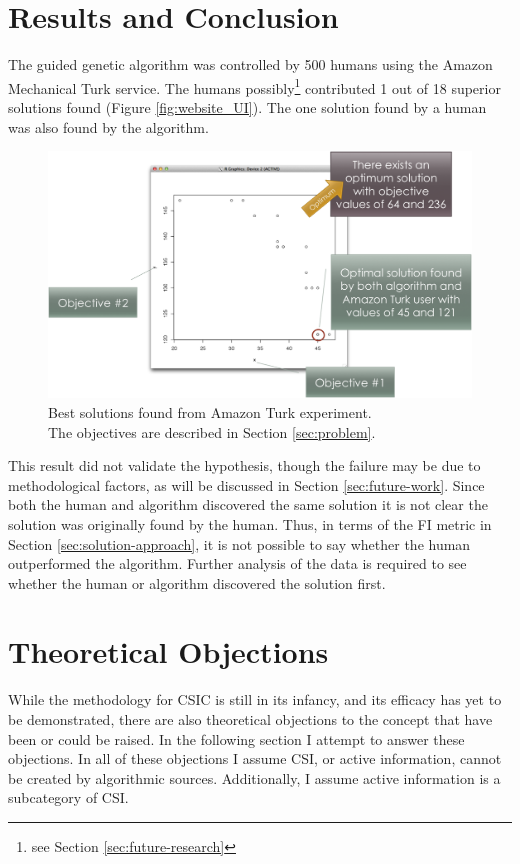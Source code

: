 \section{Results and Conclusion}
The guided genetic algorithm was controlled by 500 humans using the Amazon Mechanical Turk service.  The humans possibly\footnote{see Section \ref{sec:future-research}} contributed 1 out of 18 superior solutions found (Figure \ref{fig:website_UI}).  The one solution found by a human was also found by the algorithm.

\begin{figure}[!t]
  \centering
  \includegraphics[width=4.5in]{HollowayResults}
  \caption{Best solutions found from Amazon Turk experiment.\\The objectives are described in Section \ref{sec:problem}.}
  \label{fig:results}
\end{figure}

This result did not validate the hypothesis, though the failure may be due to methodological factors, as will be discussed in Section \ref{sec:future-work}.  Since both the human and algorithm discovered the same solution it is not clear the solution was originally found by the human.  Thus, in terms of the FI metric in Section \ref{sec:solution-approach}, it is not possible to say whether the human outperformed the algorithm.  Further analysis of the data is required to see whether the human or algorithm discovered the solution first.

\section{Theoretical Objections}\label{sec:objections}

While the methodology for CSIC is still in its infancy, and its efficacy has yet to be demonstrated, there are also theoretical objections to the concept that have been or could be raised.  In the following section I attempt to answer these objections.  In all of these objections I assume CSI, or active information, cannot be created by algorithmic sources.  Additionally, I assume active information is a subcategory of CSI.

